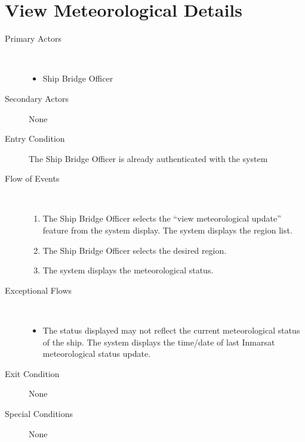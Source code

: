\documentclass[a4paper,10pt]{report}
\begin{document}
\section{View Meteorological Details}
\begin{description}
\item[Primary Actors] \
  \begin{itemize}
  \item Ship Bridge Officer
  \end{itemize}
\item[Secondary Actors] None
\item[Entry Condition]
  The Ship Bridge Officer is already authenticated with the system
\item[Flow of Events] \
  \begin{enumerate}
  \item The Ship Bridge Officer selects the ``view meteorological update'' feature from the system display. The system displays the region list.
  \item The Ship Bridge Officer selects the desired region.
  \item The system displays the meteorological status.
  \end{enumerate}
\item[Exceptional Flows] \
  \begin{itemize}
  \item The status displayed may not reflect the current meteorological status of the ship. The system displays the time/date of last Inmarsat meteorological status update.
  \end{itemize}
\item[Exit Condition] None
\item[Special Conditions] None
\end{description}
\end{document}
